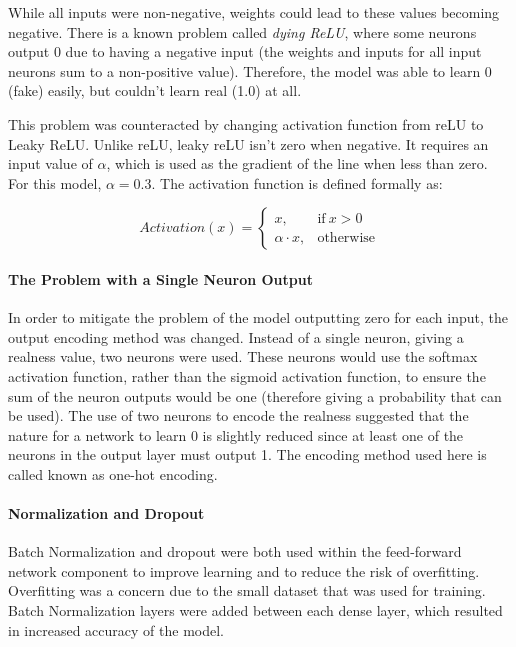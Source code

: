 \documentclass[12pt,a4paper]{article}
\begin{document}
                While all inputs were non-negative, weights could lead to these values becoming negative. There is a known problem called \emph{dying ReLU}, where some neurons output 0
                due to having a negative input (the weights and inputs for all input neurons sum to a non-positive value). Therefore, the model was able to learn 0 (fake) easily, but couldn't learn real (1.0) at all. \cite{liu_liu_2017}

                This problem was counteracted by changing activation function from reLU to Leaky ReLU. Unlike reLU, leaky reLU isn't zero when negative. It requires an input value of $\alpha$, which is used as the gradient of the line when less than zero. \cite{liu_liu_2017} For this model, $\alpha=0.3$. The activation function is defined formally as:
                
                
                \begin{equation}
                    Activation(x) =
                    \begin{cases}
                    x, & \text{if}\ x>0 \\
                    \alpha \cdot x, & \text{otherwise}
                    \end{cases}
                \end{equation}

                \paragraph{The Problem with a Single Neuron Output}
                In order to mitigate the problem of the model outputting zero for each input, the output encoding method was changed. Instead of a single neuron, giving a realness value, two neurons were used.
                These neurons would use the softmax activation function, rather than the sigmoid activation function, to ensure the sum of the neuron outputs would be one (therefore giving a probability that can be used).
                The use of two neurons to encode the realness suggested that the nature for a network to learn 0 is slightly reduced since at least one of the neurons in the output layer must output 1. The encoding method used here
                is called known as one-hot encoding.

                \paragraph{Normalization and Dropout}
                Batch Normalization and dropout were both used within the feed-forward network component to improve learning and to reduce the risk of overfitting. Overfitting was a concern due to the small dataset that was used for training.
                Batch Normalization layers were added between each dense layer, which resulted in increased accuracy of the model.
\end{document}

